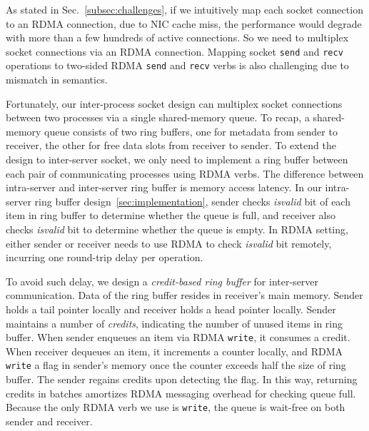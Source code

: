 As stated in Sec.~\ref{subsec:challenges}, if we intuitively map each socket connection to an RDMA connection, due to NIC cache miss, the performance would degrade with more than a few hundreds of active connections. So we need to multiplex socket connections via an RDMA connection. Mapping socket \texttt{send} and \texttt{recv} operations to two-sided RDMA \texttt{send} and \texttt{recv} verbs is also challenging due to mismatch in semantics.

Fortunately, our inter-process socket design can multiplex socket connections between two processes via a single shared-memory queue. To recap, a shared-memory queue consists of two ring buffers, one for metadata from sender to receiver, the other for free data slots from receiver to sender. To extend the design to inter-server socket, we only need to implement a ring buffer between each pair of communicating processes using RDMA verbs. The difference between intra-server and inter-server ring buffer is memory access latency. In our intra-server ring buffer design~\ref{sec:implementation}, sender checks \textit{isvalid} bit of each item in ring buffer to determine whether the queue is full, and receiver also checks \textit{isvalid} bit to determine whether the queue is empty. In RDMA setting, either sender or receiver needs to use RDMA to check \textit{isvalid} bit remotely, incurring one round-trip delay per operation.

To avoid such delay, we design a \textit{credit-based ring buffer} for inter-server communication. Data of the ring buffer resides in receiver's main memory. Sender holds a tail pointer locally and receiver holds a head pointer locally. Sender maintains a number of \textit{credits}, indicating the number of unused items in ring buffer. When sender enqueues an item via RDMA \texttt{write}, it consumes a credit. When receiver dequeues an item, it increments a counter locally, and RDMA \texttt{write} a flag in sender's memory once the counter exceeds half the size of ring buffer. The sender regains credits upon detecting the flag. In this way, returning credits in batches amortizes RDMA messaging overhead for checking queue full. Because the only RDMA verb we use is \texttt{write}, the queue is wait-free on both sender and receiver.

